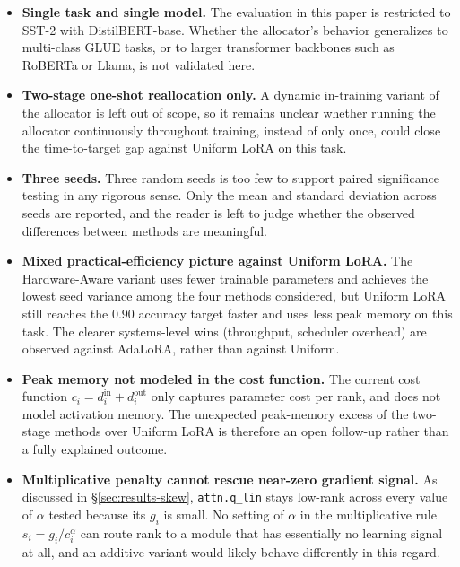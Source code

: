 \documentclass{article}
\begin{document}
\begin{itemize}
\item \textbf{Single task and single model.} The evaluation in this
      paper is restricted to SST-2 with DistilBERT-base. Whether the
      allocator's behavior generalizes to multi-class GLUE tasks, or
      to larger transformer backbones such as RoBERTa or Llama, is
      not validated here.
\item \textbf{Two-stage one-shot reallocation only.} A dynamic
      in-training variant of the allocator is left out of scope, so
      it remains unclear whether running the allocator continuously
      throughout training, instead of only once, could close the
      time-to-target gap against Uniform LoRA on this task.
\item \textbf{Three seeds.} Three random seeds is too few to support
      paired significance testing in any rigorous sense. Only the
      mean and standard deviation across seeds are reported, and the
      reader is left to judge whether the observed differences
      between methods are meaningful.
\item \textbf{Mixed practical-efficiency picture against Uniform LoRA.}
      The Hardware-Aware variant uses fewer trainable parameters and
      achieves the lowest seed variance among the four methods
      considered, but Uniform LoRA still reaches the $0.90$ accuracy
      target faster and uses less peak memory on this task. The
      clearer systems-level wins (throughput, scheduler overhead) are
      observed against AdaLoRA, rather than against Uniform.
\item \textbf{Peak memory not modeled in the cost function.} The
      current cost function $c_i = d_i^{\text{in}} + d_i^{\text{out}}$
      only captures parameter cost per rank, and does not model
      activation memory. The unexpected peak-memory excess of the
      two-stage methods over Uniform LoRA is therefore an open
      follow-up rather than a fully explained outcome.
\item \textbf{Multiplicative penalty cannot rescue near-zero gradient
      signal.} As discussed in \S\ref{sec:results-skew},
      \texttt{attn.q\_lin} stays low-rank across every value of
      $\alpha$ tested because its $g_i$ is small. No setting of
      $\alpha$ in the multiplicative rule
      $s_i = g_i / c_i^{\alpha}$ can route rank to a module that has
      essentially no learning signal at all, and an additive variant
      would likely behave differently in this regard.
\end{itemize}
\end{document}
